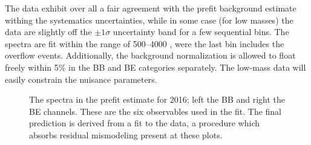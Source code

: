 The data exhibit over all a fair agreement with the prefit background estimate withing the systematics uncertainties, while in some case (for low masses) the data are slightly off the $\pm1\sigma$ uncertainty band for a few sequential bins. The spectra are fit within the range of 500--4000 \GeV, were the last bin includes the overflow events. Additionally, the \mgg background normalization is allowed to float freely within 5\% in the BB and BE categories separately. The low-mass data will easily constrain the nuisance parameters.

\begin{figure}[!htbp]{
\caption{The \mgg spectra in the prefit estimate for 2016; left the BB and right the BE channels.
These are the six observables used in the fit.
The final prediction is derived from a fit to the data, a procedure which absorbs residual mismodeling present at these plots.}
\label{fig:Prefit_spectra2016}}
\end{figure}

